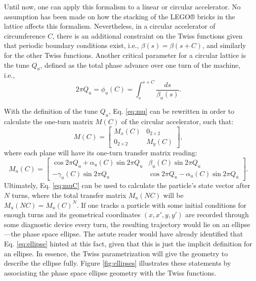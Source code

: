 Until now, one can apply this formalism to a linear or circular accelerator. No assumption has been made on how the stacking of the LEGO® bricks in the lattice affects this formalism. Nevertheless, in a circular accelerator of circumference $C$, there is an additional constraint on the Twiss functions given that periodic boundary conditions exist, i.e., $\beta(s)=\beta(s+C)$, and similarly for the other Twiss functions. Another critical parameter for a circular lattice is the tune $Q_u$, defined as the total phase advance over one turn of the machine, i.e.,
\begin{equation}
    \label{eq:tune}
    2 \pi Q_u =  \phi_u(C) = \int_s^{s+C}\frac{ds}{\beta_u (s)}. 
\end{equation}

With the definition of the tune $Q_u$, Eq. \ref{eq:mu} can be rewritten in order to calculate the one-turn matrix $M(C)$ of the circular accelerator, such that:
\begin{equation}
    \label{eq:twissmatrixC}
    M(C)= 
    \begin{bmatrix} 
    M_x(C) & 0_{2 \times 2} \\ 
    0_{2 \times 2} & M_y(C)
    \end{bmatrix},
\end{equation}
where each plane will have its one-turn transfer matrix reading:
\begin{equation}
    \label{eq:muC}
    M_u(C)= 
    \begin{bmatrix} 
        \cos 2\pi Q_u +\alpha_u(C) \sin 2\pi Q_u & \beta_u(C) \sin 2\pi Q_u \\ 
        - \gamma_u(C) \sin 2\pi Q_u & \cos 2 \pi Q_u -\alpha_u(C) \sin 2\pi Q_u
    \end{bmatrix}.
\end{equation}
Ultimately, Eq. \ref{eq:muC} can be used to calculate the particle's state vector after $N$ turns, where the total transfer matrix $M_u(NC)$ will be $M_u(NC)=M_u(C)^N$. If one tracks a particle with some initial conditions for enough turns and its geometrical coordinates $\left( x,x',y,y' \right)$ are recorded through some diagnostic device every turn, the resulting trajectory would lie on an ellipse---the phase space ellipse. The astute reader would have already identified that Eq. \ref{eq:ellipse} hinted at this fact, given that this is just the implicit definition for an ellipse. In essence, the Twiss parametrization will give the geometry to describe the ellipse fully. Figure \ref{fig:ellipses} illustrates these statements by associating the phase space ellipse geometry with the Twiss functions.

